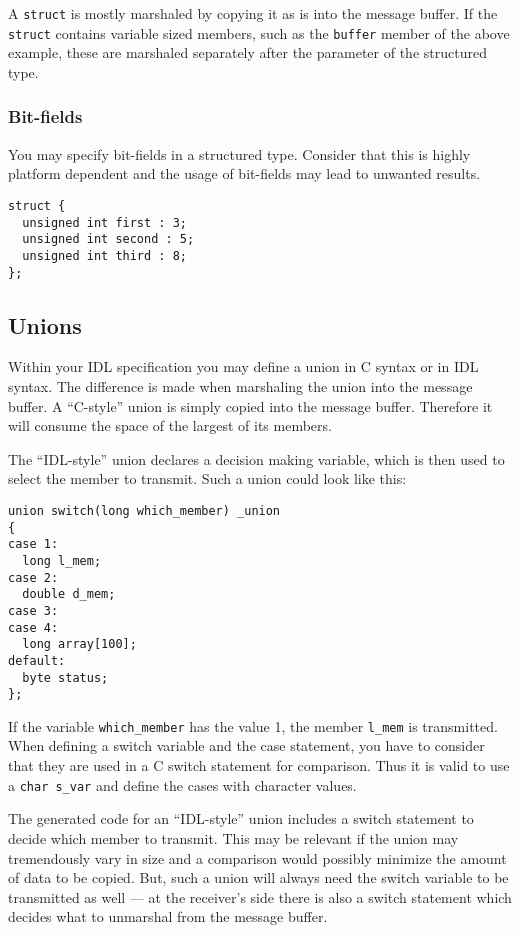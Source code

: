 
A \verb|struct| is mostly marshaled by copying it as is into the message
buffer. If the \verb|struct| contains variable sized members, such as the
\verb|buffer| member of the above example, these are marshaled separately
after the parameter of the structured type.


\subsubsection{Bit-fields}

You may specify bit-fields in a structured type. Consider that this is highly
platform dependent and the usage of bit-fields may lead to unwanted results.

\begin{verbatim}
struct {
  unsigned int first : 3;
  unsigned int second : 5;
  unsigned int third : 8;
};
\end{verbatim}

\subsection{Unions}

Within your IDL specification you may define a union in C syntax or in IDL
syntax. The difference is made when marshaling the union into the message
buffer. A ``C-style'' union is simply copied into the message buffer.
Therefore it will consume the space of the largest of its members.

The ``IDL-style'' union declares a decision making variable, which is then
used to select the member to transmit. Such a union could look like this:

\begin{verbatim}
union switch(long which_member) _union
{
case 1:
  long l_mem;
case 2:
  double d_mem;
case 3:
case 4:
  long array[100];
default:
  byte status;
};
\end{verbatim}

If the variable \verb|which_member| has the value 1, the member \verb|l_mem|
is transmitted. When defining a switch variable and the case statement, you
have to consider that they are used in a C switch statement for comparison.
Thus it is valid to use a \verb|char s_var| and define the cases with
character values.

The generated code for an ``IDL-style'' union includes a switch statement to
decide which member to transmit. This may be relevant if the union may
tremendously vary in size and a comparison would possibly minimize the amount
of data to be copied. But, such a union will always need the switch variable
to be transmitted as well --- at the receiver's side there is also a switch
statement which decides what to unmarshal from the message buffer.

